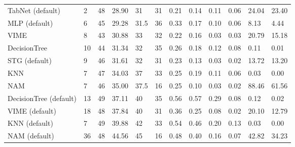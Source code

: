 \begin{tabular}{lllllrllllll}
TabNet (default) & 2 & 48 & 28.90 & 31 & 31 & 0.21 & 0.14 & 0.11 & 0.06 & 24.04 & 23.40 \\
MLP (default) & 6 & 45 & 29.28 & 31.5 & 36 & 0.33 & 0.17 & 0.10 & 0.06 & 8.13 & 4.44 \\
VIME & 8 & 43 & 30.88 & 33 & 32 & 0.22 & 0.16 & 0.03 & 0.03 & 20.79 & 15.18 \\
DecisionTree & 10 & 44 & 31.34 & 32 & 35 & 0.26 & 0.18 & 0.12 & 0.08 & 0.11 & 0.01 \\
STG (default) & 9 & 46 & 31.61 & 32 & 31 & 0.23 & 0.13 & 0.03 & 0.02 & 13.72 & 13.20 \\
KNN & 7 & 47 & 34.03 & 37 & 33 & 0.25 & 0.19 & 0.11 & 0.06 & 0.03 & 0.00 \\
NAM & 7 & 46 & 35.00 & 37.5 & 16 & 0.25 & 0.10 & 0.03 & 0.02 & 88.46 & 61.56 \\
DecisionTree (default) & 13 & 49 & 37.11 & 40 & 35 & 0.56 & 0.57 & 0.29 & 0.08 & 0.12 & 0.02 \\
VIME (default) & 18 & 48 & 37.84 & 40 & 31 & 0.36 & 0.25 & 0.08 & 0.02 & 20.10 & 12.79 \\
KNN (default) & 7 & 49 & 39.88 & 42 & 33 & 0.54 & 0.46 & 0.20 & 0.13 & 0.03 & 0.00 \\
NAM (default) & 36 & 48 & 44.56 & 45 & 16 & 0.48 & 0.40 & 0.16 & 0.07 & 42.82 & 34.23 \\
\bottomrule
\end{tabular}
